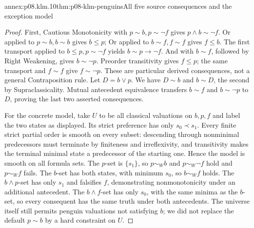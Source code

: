 \begin{annexitem}{annex:p08.klm.10}{thm:p08-klm-penguins}{All five source consequences and the exception model}
\begin{proof}
First, Cautious Monotonicity with \(p\sim b,p\sim\neg f\) gives
\(p\wedge b\sim\neg f\).
Or applied to \(p\sim b,b\sim b\) gives \(b\leq p\);
Or applied to \(b\sim f,f\sim f\) gives \(f\leq b\).
The first transport applied to \(b\leq p,p\sim\neg f\) yields
\(b\sim p\to\neg f\). And with \(b\sim f\), followed by
Right Weakening, gives \(b\sim\neg p\).
Preorder transitivity gives \(f\leq p\); the same transport and
\(f\sim f\) give \(f\sim\neg p\). These are particular
derived consequences, not a general Contraposition rule.
Let \(D=b\vee p\). We have \(D\sim b\) and \(b\sim D\),
the second by Supraclassicality. Mutual antecedent equivalence transfers
\(b\sim f\) and \(b\sim\neg p\) to \(D\), proving the last
two asserted consequences.

For the concrete model, take \(U\) to be all classical valuations on
\(b,p,f\) and label the two states as displayed. Its strict preference
has only \(s_0\prec s_1\). Every finite strict partial order is
smooth on every subset: descending through nonminimal predecessors must
terminate by finiteness and irreflexivity, and transitivity makes the
terminal minimal state a predecessor of the starting one. Hence the
model is smooth on all formula sets.
The \(p\)-set is \(\{s_1\}\), so \(p\sim_W b\) and
\(p\sim_W\neg f\) hold and \(p\sim_W f\) fails.
The \(b\)-set has both states, with minimum \(s_0\), so
\(b\sim_W f\) holds. The \(b\wedge p\)-set has only \(s_1\)
and falsifies \(f\), demonstrating nonmonotonicity under an additional
antecedent. The \(b\wedge f\)-set has only \(s_0\), with the
same minima as the \(b\)-set, so every consequent has the same truth
under both antecedents. The universe itself still permits penguin
valuations not satisfying \(b\); we did not replace the default
\(p\sim b\) by a hard constraint on \(U\).
\end{proof}
\end{annexitem}

